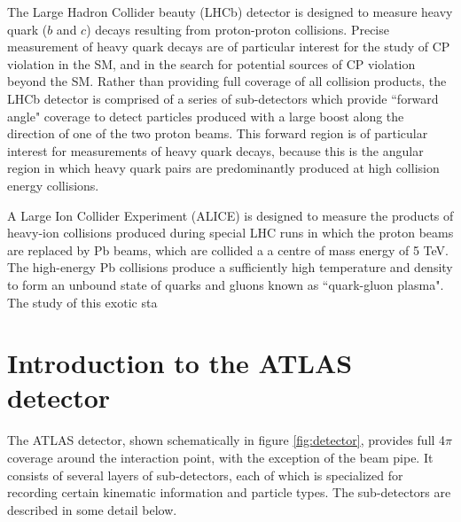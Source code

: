 The Large Hadron Collider beauty (LHCb) detector \cite{LHCb} is designed to measure heavy quark ($b$ and $c$) decays resulting from proton-proton collisions. Precise measurement of heavy quark decays are of particular interest for the study of CP violation in the SM, and in the search for potential sources of CP violation beyond the SM. Rather than providing full coverage of all collision products, the LHCb detector is comprised of a series of sub-detectors which provide ``forward angle" coverage to detect particles produced with a large boost along the direction of one of the two proton beams. This forward region is of particular interest for measurements of heavy quark decays, because this is the angular region in which heavy quark pairs are predominantly produced at high collision energy collisions.

A Large Ion Collider Experiment (ALICE) is designed to measure the products of heavy-ion collisions produced during special LHC runs in which the proton beams are replaced by Pb beams, which are collided a a centre of mass energy of 5 TeV. The high-energy Pb collisions produce a sufficiently high temperature and density to form an unbound state of quarks and gluons known as ``quark-gluon plasma". The study of this exotic sta



\section{Introduction to the ATLAS detector}

The ATLAS detector, shown schematically in figure \ref{fig:detector}, provides full 4$\pi$ coverage around the interaction point, with the exception of the beam pipe. It consists of several layers of sub-detectors, each of which is specialized for recording certain kinematic information and particle types. The sub-detectors are described in some detail below. 


